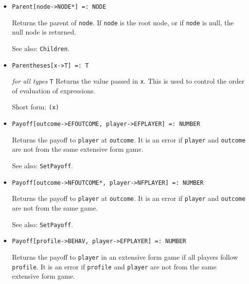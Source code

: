 \begin{itemize}

\item{}
\protect \large \begin{verbatim}
Parent[node->NODE*] =: NODE 
\end{verbatim}\normalsize

\bd
Returns the parent of \verb+node+.  If \verb+node+ is the root node,
or if \verb+node+ is null, the null node is returned.
\item [See also:] \verb+Children+.
\ed

\item{}
\protect \large \begin{verbatim}
Parentheses[x->T] =: T 
\end{verbatim}\normalsize

{\it for all types} {\tt T}
\bd
Returns the value passed in \verb+x+.  This is used to control
the order of evaluation of expressions.
\item [Short form:] \verb+(x)+
\ed

\item{}
\protect \large \begin{verbatim}
Payoff[outcome->EFOUTCOME, player->EFPLAYER] =: NUMBER 
\end{verbatim}\normalsize
{}
\bd
Returns the payoff to \verb+player+ at \verb+outcome+.  It is an error if
\verb+player+ and \verb+outcome+ are not from the same extensive form game.
\item [See also:] \verb+SetPayoff+.
\ed

\item{}
\protect \large \begin{verbatim}
Payoff[outcome->NFOUTCOME*, player->NFPLAYER] =: NUMBER 
\end{verbatim}\normalsize

\bd
Returns the payoff to \verb+player+ at \verb+outcome+.  It is an error if
\verb+player+ and \verb+outcome+ are not from the same game.
\item [See also:] \verb+SetPayoff+.
\ed

\item{}
\protect \large \begin{verbatim}
Payoff[profile->BEHAV, player->EFPLAYER] =: NUMBER 
\end{verbatim}\normalsize

\bd
Returns the payoff to \verb+player+ in an extensive form game if all
players follow \verb+profile+.  It is an error if \verb+profile+
and \verb+player+ are not from the same extensive form game.
\ed


\end{itemize}
